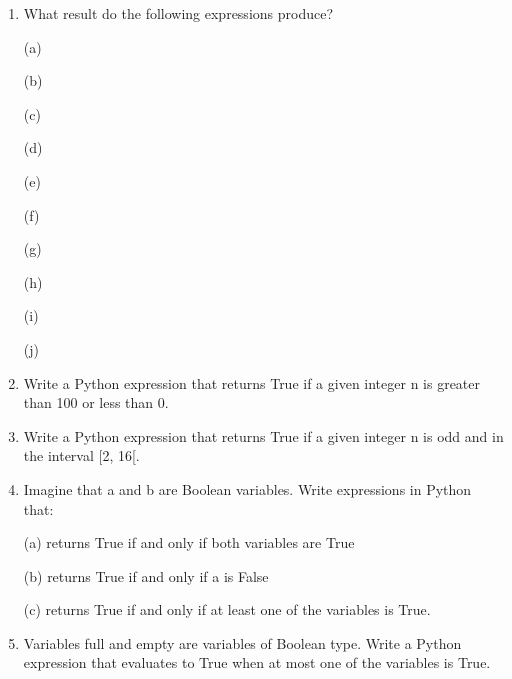 \begin{enumerate}
\setlength\itemsep{2em}

\item What result do the following expressions produce?

(a)  

(b) 

(c) 

(d) 

(e) 

(f) 

(g) 

(h) 

(i) 

(j)  




\item Write a Python expression that returns True if a given integer n is greater than 100 or less than 0.


\item Write a Python expression that returns True if a given integer n is odd and in the interval [2, 16[.


\item Imagine that a and b are Boolean variables. Write expressions in Python that:

(a) returns True if and only if both variables are True

(b) returns True if and only if a is False

(c) returns True if and only if at least one of the variables is True.



\item Variables full and empty are variables of Boolean type. Write a Python expression that evaluates to True when at most one of the variables is True.


\end{enumerate}
